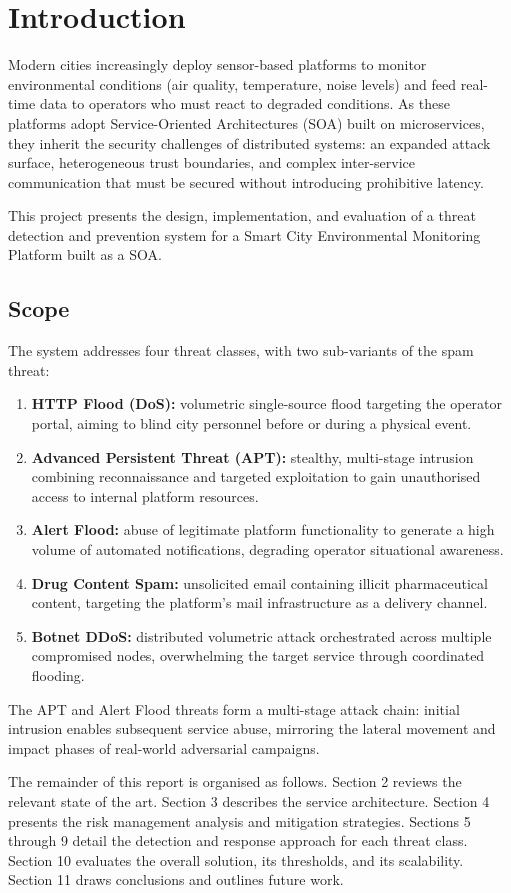 \section{Introduction}
\label{sec:introduction}

Modern cities increasingly deploy sensor-based platforms to monitor environmental
conditions (air quality, temperature, noise levels) and feed real-time data to operators
who must react to degraded conditions. As these platforms adopt Service-Oriented
Architectures (SOA) built on microservices, they inherit the security challenges of distributed
systems: an expanded attack surface, heterogeneous trust boundaries, and complex
inter-service communication that must be secured without introducing prohibitive latency.

This project presents the design, implementation, and evaluation of a threat detection
and prevention system for a Smart City Environmental Monitoring Platform built as a SOA.

\subsection{Scope}

The system addresses four threat classes, with two sub-variants of the spam threat:

\begin{enumerate}[leftmargin=*]
  \item \textbf{HTTP Flood (DoS):} volumetric single-source flood targeting the
        operator portal, aiming to blind city personnel before or during a physical event.
  \item \textbf{Advanced Persistent Threat (APT):} stealthy, multi-stage intrusion
        combining reconnaissance and targeted exploitation to gain unauthorised access
        to internal platform resources.
  \item \textbf{Alert Flood:} abuse of legitimate platform functionality to generate
        a high volume of automated notifications, degrading operator situational awareness.
  \item \textbf{Drug Content Spam:} unsolicited email containing illicit pharmaceutical
        content, targeting the platform's mail infrastructure as a delivery channel.
  \item \textbf{Botnet DDoS:} distributed volumetric attack orchestrated across multiple
        compromised nodes, overwhelming the target service through coordinated flooding.
\end{enumerate}

The APT and Alert Flood threats form a multi-stage attack chain: initial intrusion
enables subsequent service abuse, mirroring the lateral movement and impact phases of
real-world adversarial campaigns.

The remainder of this report is organised as follows. Section 2 reviews the relevant
state of the art. Section 3 describes the service architecture. Section 4 presents the
risk management analysis and mitigation strategies. Sections 5 through 9 detail the
detection and response approach for each threat class. Section 10 evaluates the overall
solution, its thresholds, and its scalability. Section 11 draws conclusions and outlines
future work.

